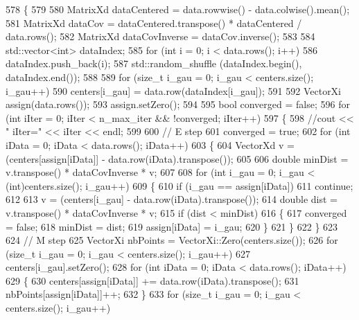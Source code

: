 \begin{DoxyCode}
578 \{
579 
580   MatrixXd dataCentered = data.rowwise() - data.colwise().mean();
581   MatrixXd dataCov = dataCentered.transpose() * dataCentered / data.rows();
582   MatrixXd dataCovInverse = dataCov.inverse();
583 
584   std::vector<int> dataIndex;
585   \textcolor{keywordflow}{for} (\textcolor{keywordtype}{int} i = 0; i < data.rows(); i++)
586     dataIndex.push\_back(i); 
587   std::random\_shuffle (dataIndex.begin(), dataIndex.end());
588 
589   \textcolor{keywordflow}{for} (\textcolor{keywordtype}{size\_t} i\_gau = 0; i\_gau < centers.size(); i\_gau++)
590     centers[i\_gau] = data.row(dataIndex[i\_gau]);
591 
592   VectorXi assign(data.rows());
593   assign.setZero();
594 
595   \textcolor{keywordtype}{bool} converged = \textcolor{keyword}{false};
596   \textcolor{keywordflow}{for} (\textcolor{keywordtype}{int} iIter = 0; iIter < n\_max\_iter && !converged; iIter++)
597   \{
598     \textcolor{comment}{//cout << "  iIter=" << iIter << endl;}
599     
600     \textcolor{comment}{// E step}
601     converged = \textcolor{keyword}{true};
602     \textcolor{keywordflow}{for} (\textcolor{keywordtype}{int} iData = 0; iData < data.rows(); iData++)
603     \{
604       VectorXd v = (centers[assign[iData]] - data.row(iData).transpose());
605 
606       \textcolor{keywordtype}{double} minDist = v.transpose() * dataCovInverse * v;
607 
608       \textcolor{keywordflow}{for} (\textcolor{keywordtype}{int} i\_gau = 0; i\_gau < (int)centers.size(); i\_gau++)
609       \{
610         \textcolor{keywordflow}{if} (i\_gau == assign[iData])
611           \textcolor{keywordflow}{continue};
612 
613         v = (centers[i\_gau] - data.row(iData).transpose());
614         \textcolor{keywordtype}{double} dist = v.transpose() * dataCovInverse * v;
615         \textcolor{keywordflow}{if} (dist < minDist)
616         \{
617           converged = \textcolor{keyword}{false};
618           minDist = dist;
619           assign[iData] = i\_gau;
620         \}
621       \}
622     \}
623 
624     \textcolor{comment}{// M step}
625     VectorXi nbPoints = VectorXi::Zero(centers.size());
626     \textcolor{keywordflow}{for} (\textcolor{keywordtype}{size\_t} i\_gau = 0; i\_gau < centers.size(); i\_gau++)
627       centers[i\_gau].setZero();
628     \textcolor{keywordflow}{for} (\textcolor{keywordtype}{int} iData = 0; iData < data.rows(); iData++)
629     \{
630       centers[assign[iData]] += data.row(iData).transpose();
631       nbPoints[assign[iData]]++;
632     \}
633     \textcolor{keywordflow}{for} (\textcolor{keywordtype}{size\_t} i\_gau = 0; i\_gau < centers.size(); i\_gau++)

\end{DoxyCode}
